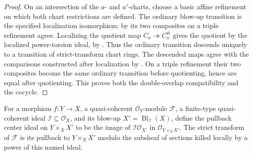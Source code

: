 \begin{proof}
  On an intersection of the $a$- and $a'$-charts, choose a basic affine
  refinement on which both chart restrictions are defined.  The ordinary
  blow-up transition is the specified localization isomorphism; by
   its two composites on a
  triple refinement agree.  Localizing the quotient map
  $C_a\twoheadrightarrow C_a^{\mathrm{st}}$ gives the quotient by the
  localized power-torsion ideal, by
  .  Thus the
  ordinary transition descends uniquely to a transition of strict-transform
  chart rings.  The descended maps agree with the comparisons constructed
  after localization by
  .  On a triple
  refinement their two composites become the same ordinary transition before
  quotienting, hence are equal after quotienting.  This proves both the
  double-overlap compatibility and the cocycle.
\end{proof}

\begin{definition}
  \label{def:nagata-module-strict-transform}

  For a morphism $f\colon Y\to X$, a quasi-coherent
  $\mathcal O_Y$-module $\mathcal F$, a finite-type quasi-coherent ideal
  $\mathcal I\subseteq\mathcal O_X$, and its blow-up
  $X'=\operatorname{Bl}_{\mathcal I}(X)$, define the pullback center ideal on
  $Y\times_XX'$ to be the image of
  $\mathcal I\mathcal O_{X'}$ in $\mathcal O_{Y\times_XX'}$.  The strict
  transform of $\mathcal F$ is its pullback to $Y\times_XX'$ modulo the
  subsheaf of sections killed locally by a power of this named ideal.
\end{definition}

